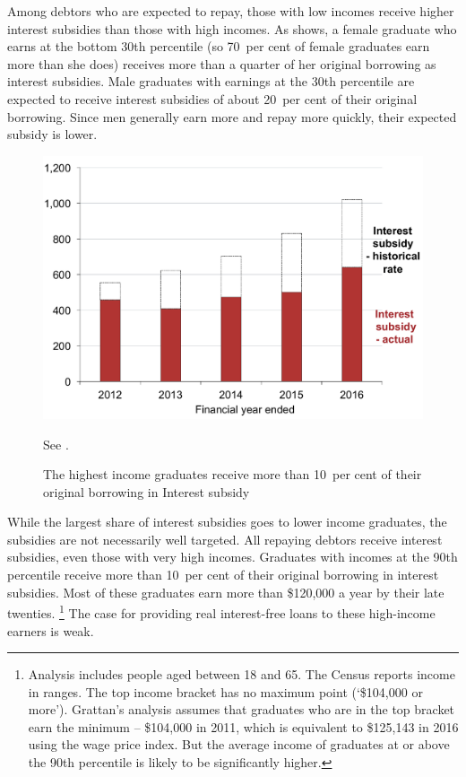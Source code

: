\documentclass[embargoed]{grattan}
\begin{document}
Among debtors who are expected to repay, those with low incomes receive higher interest subsidies than those with high incomes.
As  shows, a female graduate who earns at the bottom 30{th} percentile (so 70~per cent of female graduates earn more than she does) receives more than a quarter of her original borrowing as interest subsidies.
Male graduates with earnings at the 30{th} percentile are expected to receive interest subsidies of about 20~per cent of their original borrowing.
Since men generally earn more and repay more quickly, their expected subsidy is lower.

\begin{figure}
\caption{The highest income graduates receive more than 10~per cent of their original borrowing in \gls{Interest subsidy}}\label{fig:fig10-highest-income-grads-receive-over-10pc-original-borrowing-interest-subsidy}

\includegraphics[page=10]{atlas/Chartpack.pdf}

%
{{See .}}
\end{figure}

While the largest share of interest subsidies goes to lower income graduates, the subsidies are not necessarily well targeted.
All repaying debtors receive interest subsidies, even those with very high incomes.
Graduates with incomes at the 90{th} percentile receive more than 10~per cent of their original borrowing in interest subsidies.
Most of these graduates earn more than \$120,000 a year by their late twenties.%
\footnote{Analysis includes people aged between 18 and 65.
The Census reports income in ranges.
The top income bracket has no maximum point (`\$104,000 or more').
Grattan's analysis assumes that graduates who are in the top bracket earn the minimum -- \$104,000 in 2011, which is equivalent to \$125,143 in 2016 using the wage price index.
But the average income of graduates at or above the 90{th} percentile is likely to be significantly higher.} The case for providing real interest-free loans to these high-income earners is weak.
\end{document}
